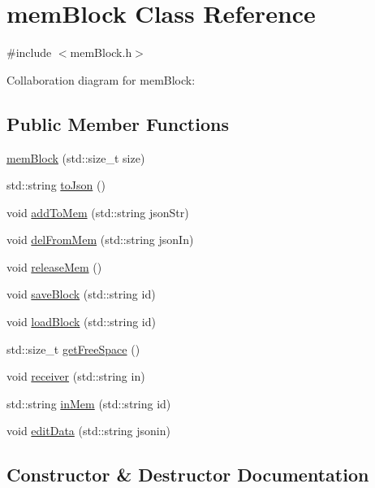 \hypertarget{classmemBlock}{}\section{mem\+Block Class Reference}
\label{classmemBlock}


{\ttfamily \#include $<$mem\+Block.\+h$>$}



Collaboration diagram for mem\+Block\+:
\subsection*{Public Member Functions}
\begin{DoxyCompactItemize}
\item 
\hyperlink{classmemBlock_a1093bea602005d5bb0bc97f253d19244}{mem\+Block} (std\+::size\+\_\+t size)
\item 
std\+::string \hyperlink{classmemBlock_a3c445277be1c4191aa766a95cfd98173}{to\+Json} ()
\item 
void \hyperlink{classmemBlock_a5cb4510c0c761be4b4e6c62e47a2d53e}{add\+To\+Mem} (std\+::string json\+Str)
\item 
void \hyperlink{classmemBlock_ad188f3126b9c7bdcbceaabd08044f741}{del\+From\+Mem} (std\+::string json\+In)
\item 
void \hyperlink{classmemBlock_ad85e0897e32107aa528d6bdec1c79ce4}{release\+Mem} ()
\item 
void \hyperlink{classmemBlock_adcbfb18e1d6296725dbcd993de4f6deb}{save\+Block} (std\+::string id)
\item 
void \hyperlink{classmemBlock_a406ebdff679c1e0b25f12f211f41f983}{load\+Block} (std\+::string id)
\item 
std\+::size\+\_\+t \hyperlink{classmemBlock_a971965e8165ee5e97a83e2381d9ec9a9}{get\+Free\+Space} ()
\item 
void \hyperlink{classmemBlock_ac520227da19e01acda51ceed9fd96d37}{receiver} (std\+::string in)
\item 
std\+::string \hyperlink{classmemBlock_a43e7e9052ba94d6ed6259a616f00c355}{in\+Mem} (std\+::string id)
\item 
void \hyperlink{classmemBlock_ab6706d6c18cce891b57d449697eeff06}{edit\+Data} (std\+::string jsonin)
\end{DoxyCompactItemize}


\subsection{Constructor \& Destructor Documentation}
